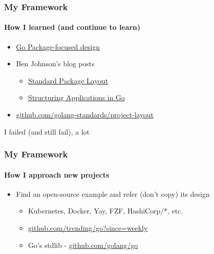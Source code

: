 
\begin{frame}
  \frametitle{My Framework}
  \framesubtitle{How I learned (and continue to learn)}

  \begin{itemize}
    \item \href{https://blog.gopheracademy.com/advent-2016/go-and-package-focused-design/}{Go Package-focused design}
    \item Ben Johnson's blog posts
    \begin{itemize}
      \item \href{https://medium.com/@benbjohnson/standard-package-layout-7cdbc8391fc1}{Standard Package Layout}
      \item \href{https://medium.com/@benbjohnson/structuring-applications-in-go-3b04be4ff091}{Structuring Applications in Go}
    \end{itemize}
  \item \url{github.com/golang-standards/project-layout}
  \end{itemize}

  \pause
  \vspace{1em}
  \centering
  I failed (and still fail), a lot
\end{frame}

\begin{frame}
  \frametitle{My Framework}
  \framesubtitle{How I approach new projects}

  \begin{itemize}
    \item Find an open-source example and refer (don't copy) its design
    \begin{itemize}
      \item Kubernetes, Docker, Yay, FZF, HashiCorp/*, etc.
      \item \url{github.com/trending/go?since=weekly}
      \item Go's stdlib - \url{github.com/golang/go}
    \end{itemize}
  \end{itemize}

\end{frame}
